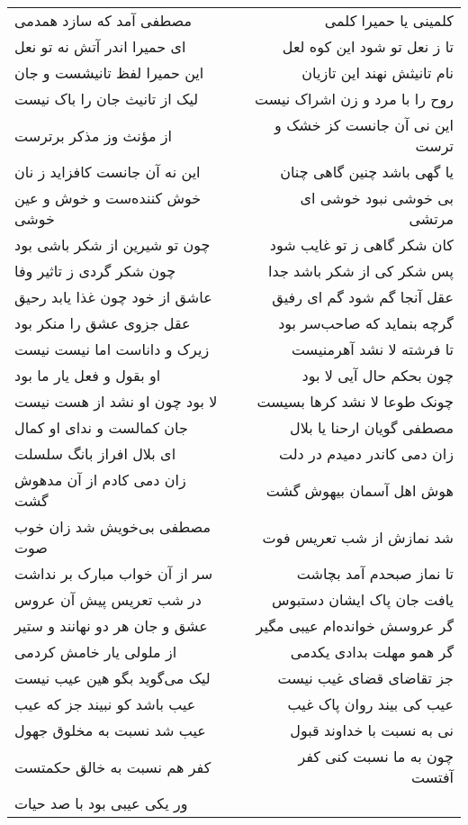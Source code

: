 \begin{center}
\begin{longtable}{l p{0.5cm} r}
مصطفی آمد که سازد همدمی
&&
کلمینی یا حمیرا کلمی
\\
ای حمیرا اندر آتش نه تو نعل
&&
تا ز نعل تو شود این کوه لعل
\\
این حمیرا لفظ تانیشست و جان
&&
نام تانیثش نهند این تازیان
\\
لیک از تانیث جان را باک نیست
&&
روح را با مرد و زن اشراک نیست
\\
از مؤنث وز مذکر برترست
&&
این نی آن جانست کز خشک و ترست
\\
این نه آن جانست کافزاید ز نان
&&
یا گهی باشد چنین گاهی چنان
\\
خوش کننده‌ست و خوش و عین خوشی
&&
بی خوشی نبود خوشی ای مرتشی
\\
چون تو شیرین از شکر باشی بود
&&
کان شکر گاهی ز تو غایب شود
\\
چون شکر گردی ز تاثیر وفا
&&
پس شکر کی از شکر باشد جدا
\\
عاشق از خود چون غذا یابد رحیق
&&
عقل آنجا گم شود گم ای رفیق
\\
عقل جزوی عشق را منکر بود
&&
گرچه بنماید که صاحب‌سر بود
\\
زیرک و داناست اما نیست نیست
&&
تا فرشته لا نشد آهرمنیست
\\
او بقول و فعل یار ما بود
&&
چون بحکم حال آیی لا بود
\\
لا بود چون او نشد از هست نیست
&&
چونک طوعا لا نشد کرها بسیست
\\
جان کمالست و ندای او کمال
&&
مصطفی گویان ارحنا یا بلال
\\
ای بلال افراز بانگ سلسلت
&&
زان دمی کاندر دمیدم در دلت
\\
زان دمی کادم از آن مدهوش گشت
&&
هوش اهل آسمان بیهوش گشت
\\
مصطفی بی‌خویش شد زان خوب صوت
&&
شد نمازش از شب تعریس فوت
\\
سر از آن خواب مبارک بر نداشت
&&
تا نماز صبحدم آمد بچاشت
\\
در شب تعریس پیش آن عروس
&&
یافت جان پاک ایشان دستبوس
\\
عشق و جان هر دو نهانند و ستیر
&&
گر عروسش خوانده‌ام عیبی مگیر
\\
از ملولی یار خامش کردمی
&&
گر همو مهلت بدادی یکدمی
\\
لیک می‌گوید بگو هین عیب نیست
&&
جز تقاضای قضای غیب نیست
\\
عیب باشد کو نبیند جز که عیب
&&
عیب کی بیند روان پاک غیب
\\
عیب شد نسبت به مخلوق جهول
&&
نی به نسبت با خداوند قبول
\\
کفر هم نسبت به خالق حکمتست
&&
چون به ما نسبت کنی کفر آفتست
\\
ور یکی عیبی بود با صد حیات

\end{longtable}
\end{center}
